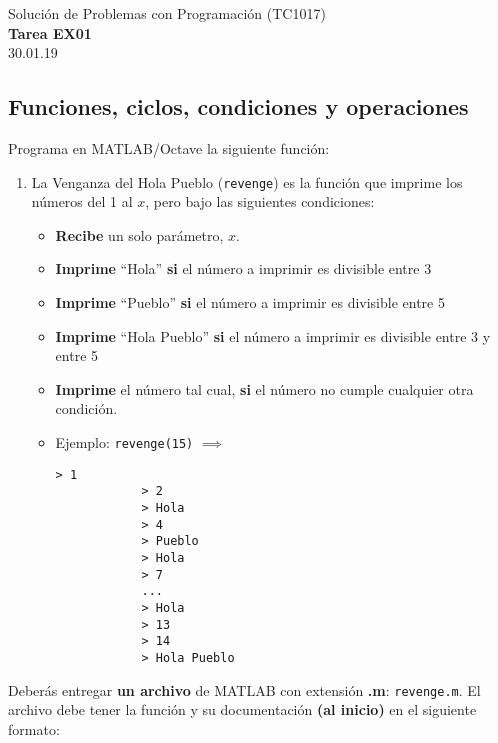 \documentclass[]{book}
\newcommand{\matlab}[1]{\lstinline[style=Matlab-pyglike]!#1!}
\theoremstyle{definition}
\begin{document}
\begin{center}
{\huge Solución de Problemas con Programación (TC1017)}\\[1.5ex]
{\large \textbf{Tarea EX01}\\[1.5ex] %
30.01.19} %
\end{center}

\vspace{0.2 cm}

\subsection*{Funciones, ciclos, condiciones y operaciones}

Programa en MATLAB/Octave la siguiente función:

\begin{enumerate}[label=\alph*)]
    \itemsep2.5ex
    \item La Venganza del Hola Pueblo (\matlab{revenge}) es la función que imprime los números del 1 al $x$, pero bajo las siguientes condiciones: 
    \begin{itemize}
        \item \textbf{Recibe} un solo parámetro, $x$.
        \item \textbf{Imprime} ``Hola'' \textbf{si} el número a imprimir es divisible entre 3
        \item \textbf{Imprime} ``Pueblo'' \textbf{si} el número a imprimir es divisible entre 5
        \item \textbf{Imprime} ``Hola Pueblo'' \textbf{si} el número a imprimir es divisible entre 3 y entre 5
        \item \textbf{Imprime} el número tal cual, \textbf{si} el número no cumple cualquier otra condición.
        \item Ejemplo: \texttt{revenge(15)} $\implies$
        \begin{lstlisting}[style=Matlab-editor]
            > 1
            > 2
            > Hola
            > 4
            > Pueblo
            > Hola
            > 7
            ...
            > Hola
            > 13
            > 14
            > Hola Pueblo
        \end{lstlisting}
    \end{itemize}
\end{enumerate}

\bigskip

Deberás entregar \textbf{un archivo} de MATLAB con extensión \textbf{.m}: \texttt{revenge.m}.
El archivo debe tener la función y su documentación \textbf{(al inicio)} en el siguiente formato:
\end{document}
